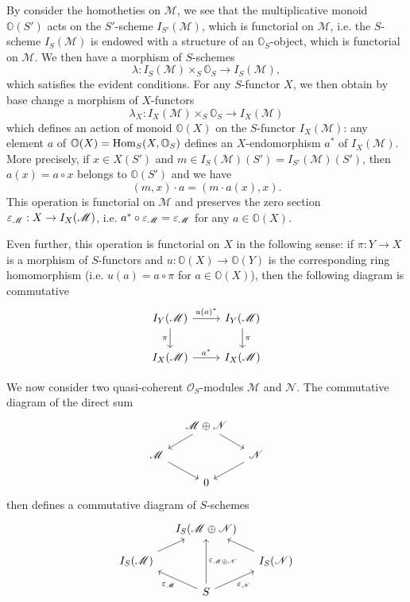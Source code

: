 \begin{remark}\label{scheme tangent bundle I_S action of O(S)}
By consider the homotheties on $\mathscr{M}$, we see that the multiplicative monoid $\mathbb{O}(S')$ acts on the $S'$-scheme $I_{S'}(\mathscr{M})$, which is functorial on $\mathscr{M}$, i.e. the $S$-scheme $I_S(\mathscr{M})$ is endowed with a structure of an $\mathbb{O}_S$-object, which is functorial on $\mathscr{M}$. We then have a morphism of $S$-schemes
\[\lambda:I_S(\mathscr{M})\times_S\mathbb{O}_S\to I_S(\mathscr{M}),\]
which satisfies the evident conditions. For any $S$-functor $X$, we then obtain by base change a morphism of $X$-functors
\[\lambda_X:I_X(\mathscr{M})\times_S\mathbb{O}_S\to I_X(\mathscr{M})\]
which defines an action of monoid $\mathbb{O}(X)$ on the $S$-functor $I_X(\mathscr{M})$: any element $a$ of $\mathbb{O}(X)=\mathrm{Hom}_S(X,\mathbb{O}_S)$ defines an $X$-endomorphism $a^*$ of $I_X(\mathscr{M})$. More precisely, if $x\in X(S')$ and $m\in I_S(\mathscr{M})(S')=I_{S'}(\mathscr{M})(S')$, then $a(x)=a\circ x$ belongs to $\mathbb{O}(S')$ and we have
\[(m,x)\cdot a=(m\cdot a(x),x).\]
This operation is functorial on $\mathscr{M}$ and preserves the zero section $\varepsilon_\mathscr{M}:X\to I_X(\mathscr{M})$, i.e. $a^*\circ\varepsilon_\mathscr{M}=\varepsilon_\mathscr{M}$ for any $a\in\mathbb{O}(X)$.\par
Even further, this operation is functorial on $X$ in the following sense: if $\pi:Y\to X$ is a morphism of $S$-functors and $u:\mathbb{O}(X)\to\mathbb{O}(Y)$ is the corresponding ring homomorphism (i.e. $u(a)=a\circ\pi$ for $a\in\mathbb{O}(X)$), then the following diagram is commutative
\[\begin{tikzcd}
I_Y(\mathscr{M})\ar[r,"u(a)^*"]\ar[d,swap,"\pi"]&I_Y(\mathscr{M})\ar[d,"\pi"]\\
I_X(\mathscr{M})\ar[r,"a^*"]&I_X(\mathscr{M})
\end{tikzcd}\]
\end{remark}

We now consider two quasi-coherent $\mathscr{O}_S$-modules $\mathscr{M}$ and $\mathscr{N}$. The commutative diagram of the direct sum
\[\begin{tikzcd}[row sep=4mm,column sep=4mm]
&\mathscr{M}\oplus\mathscr{N}\ar[ld]\ar[rd]&\\
\mathscr{M}\ar[rd]&&\mathscr{N}\ar[ld]\\
&0&
\end{tikzcd}\]
then defines a commutative diagram of $S$-schemes
\begin{equation}\label{scheme dual number of direct sum Cartesian diagram-1}
\begin{tikzcd}[row sep=4mm,column sep=4mm]
&I_S(\mathscr{M}\oplus\mathscr{N})&\\
I_S(\mathscr{M})\ar[ru]&&I_S(\mathscr{N})\ar[lu]\\
&S\ar[ru,swap,"\eps_\mathscr{N}"]\ar[lu,"\eps_\mathscr{M}"]\ar[uu,swap,"\eps_{\mathscr{M}\oplus\mathscr{N}}"]&
\end{tikzcd}
\end{equation}

